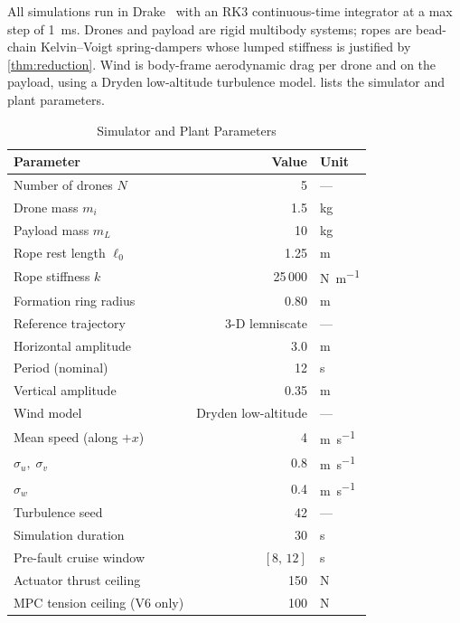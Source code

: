 
All simulations run in Drake~\cite{drake} with an RK3 continuous-time integrator at a max step of \SI{1}{\milli\second}. Drones and payload are rigid multibody systems; ropes are bead-chain Kelvin--Voigt spring-dampers whose lumped stiffness is justified by \cref{thm:reduction}. Wind is body-frame aerodynamic drag per drone and on the payload, using a Dryden low-altitude turbulence model.  lists the simulator and plant parameters.

\begin{table}[htbp]
  \caption{Simulator and Plant Parameters}
  \label{tab:sim-params}
  \centering
  \begin{tabular}{lrl}
    \toprule
    Parameter                        & Value     & Unit                       \\
    \midrule
    Number of drones $N$             & 5         & ---                        \\
    Drone mass $m_i$                 & 1.5       & \si{\kilo\gram}            \\
    Payload mass $m_L$               & 10        & \si{\kilo\gram}            \\
    Rope rest length $\ell_0$        & 1.25      & \si{\metre}                \\
    Rope stiffness $k$               & 25\,000   & \si{\newton\per\metre}     \\
    Formation ring radius            & 0.80      & \si{\metre}                \\
    Reference trajectory             & 3-D lemniscate & ---               \\
    \quad Horizontal amplitude       & 3.0       & \si{\metre}                \\
    \quad Period (nominal)           & 12        & \si{\second}               \\
    \quad Vertical amplitude         & 0.35      & \si{\metre}                \\
    Wind model                       & Dryden low-altitude & ---          \\
    \quad Mean speed (along $+x$)    & 4         & \si{\metre\per\second}     \\
    \quad $\sigma_u,\;\sigma_v$      & 0.8       & \si{\metre\per\second}     \\
    \quad $\sigma_w$                 & 0.4       & \si{\metre\per\second}     \\
    Turbulence seed                  & 42        & ---                        \\
    Simulation duration              & 30        & \si{\second}               \\
    Pre-fault cruise window          & $[8,\,12]$  & \si{\second}             \\
    Actuator thrust ceiling          & 150       & \si{\newton}               \\
    MPC tension ceiling (V6 only)    & 100       & \si{\newton}               \\
    \bottomrule
  \end{tabular}
\end{table}

